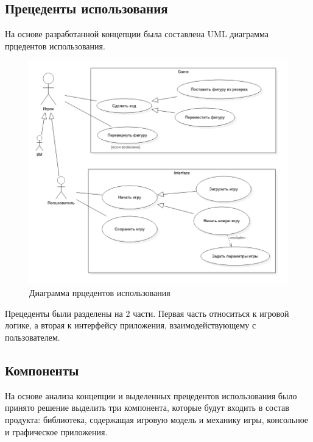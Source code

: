 \subsection{Прецеденты использования}

На основе разработанной концепции была составлена UML диаграмма прцедентов использования.

\begin{figure}[H]
	\begin{center}
		\includegraphics[scale=0.5]{../diagrams/UseCaseDiagram1.png}
		\caption{Диаграмма прцедентов использования}
		\label{pic:use_case}
	\end{center}
\end{figure}

Прецеденты были разделены на 2 части. Первая часть относиться к игровой логике, а вторая к интерфейсу приложения, взаимодействующему с пользователем.

\subsection{Компоненты}

На основе анализа концепции и выделенных прецедентов использования было принято решение выделить три компонента, которые будут входить в состав продукта: библиотека, содержащая игровую модель и механику игры, консольное и графическое приложения.

